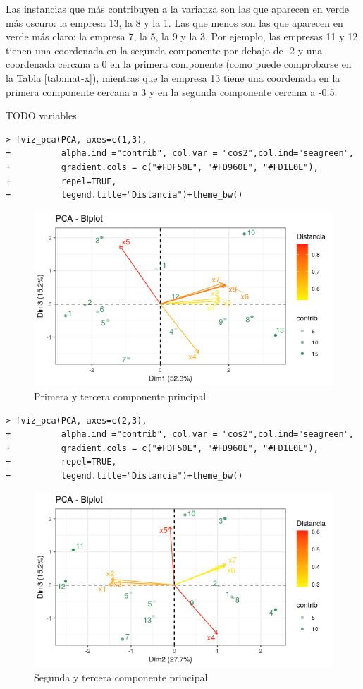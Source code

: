 \documentclass[12pt]{article}
\begin{document}
\pagebreak

Las instancias que más contribuyen a la varianza son las que aparecen
en verde más oscuro: la empresa 13, la 8 y la 1. Las que menos son las
que aparecen en verde más claro: la empresa 7, la 5, la 9 y la 3. Por
ejemplo, las empresas 11 y 12 tienen una coordenada en la segunda
componente por debajo de -2 y una coordenada cercana a 0 en la primera
componente (como puede comprobarse en la Tabla \ref{tab:mat-x}),
mientras que la empresa 13 tiene una coordenada en la primera
componente cercana a 3 y en la segunda componente cercana a -0.5.

TODO variables

\begin{verbatim}
> fviz_pca(PCA, axes=c(1,3),
+          alpha.ind ="contrib", col.var = "cos2",col.ind="seagreen",
+          gradient.cols = c("#FDF50E", "#FD960E", "#FD1E0E"),
+          repel=TRUE,
+          legend.title="Distancia")+theme_bw()
\end{verbatim}

\begin{figure}[H]
  \centering
  \includegraphics[width=120mm]{imgs/biplot13}
  \caption{Primera y tercera componente principal}
  \label{fig:biplot13}
\end{figure}

\begin{verbatim}
> fviz_pca(PCA, axes=c(2,3),
+          alpha.ind ="contrib", col.var = "cos2",col.ind="seagreen",
+          gradient.cols = c("#FDF50E", "#FD960E", "#FD1E0E"),
+          repel=TRUE,
+          legend.title="Distancia")+theme_bw()
\end{verbatim}

\begin{figure}[H]
  \centering
  \includegraphics[width=120mm]{imgs/biplot23}
  \caption{Segunda y tercera componente principal}
  \label{fig:biplot23}
\end{figure}
\end{document}
